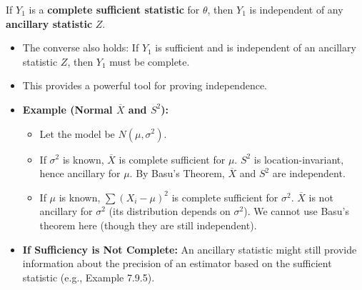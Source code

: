 \begin{theorem}[Basu]
If $Y_1$ is a \textbf{complete sufficient statistic} for $\theta$, then $Y_1$ is independent of any \textbf{ancillary statistic} $Z$.
\end{theorem}
\begin{itemize}
	\item The converse also holds: If $Y_1$ is sufficient and is independent of an ancillary statistic $Z$, then $Y_1$ must be complete.
	\item This provides a powerful tool for proving independence.
	\item \textbf{Example (Normal $\overline{X}$ and $S^2$):}
	\begin{itemize}
		\item Let the model be $N(\mu, \sigma^2)$.
		\item If $\sigma^2$ is known, $\overline{X}$ is complete sufficient for $\mu$. $S^2$ is location-invariant, hence ancillary for $\mu$. By Basu's Theorem, $\overline{X}$ and $S^2$ are independent.
		\item If $\mu$ is known, $\sum(X_i-\mu)^2$ is complete sufficient for $\sigma^2$. $\overline{X}$ is not ancillary for $\sigma^2$ (its distribution depends on $\sigma^2$). We cannot use Basu's theorem here (though they are still independent).
	\end{itemize}
	\item \textbf{If Sufficiency is Not Complete:} An ancillary statistic might still provide information about the precision of an estimator based on the sufficient statistic (e.g., Example 7.9.5).
\end{itemize}
